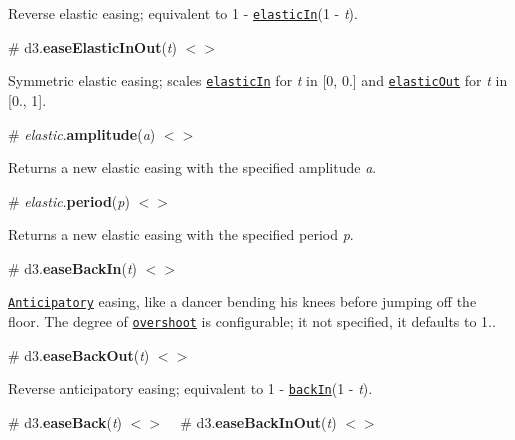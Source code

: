 Reverse elastic easing; equivalent to 1 -\/ \href{#easeElasticIn}{\tt elastic\+In}(1 -\/ {\itshape t}).

\href{http://bl.ocks.org/mbostock/248bac3b8e354a9103c4/#elasticOut}{\tt }

\label{_easeElasticInOut}%
\# d3.{\bfseries ease\+Elastic\+In\+Out}({\itshape t}) \href{https://github.com/d3/d3-ease/blob/master/src/elastic.js#L31}{\tt $<$$>$}

Symmetric elastic easing; scales \href{#easeElasticIn}{\tt elastic\+In} for {\itshape t} in \mbox{[}0, 0.\mbox{]} and \href{#easeElasticOut}{\tt elastic\+Out} for {\itshape t} in \mbox{[}0., 1\mbox{]}.

\href{http://bl.ocks.org/mbostock/248bac3b8e354a9103c4/#elasticInOut}{\tt }

\label{_elastic_amplitude}%
\# {\itshape elastic}.{\bfseries amplitude}({\itshape a}) \href{https://github.com/d3/d3-ease/blob/master/src/elastic.js#L40}{\tt $<$$>$}

Returns a new elastic easing with the specified amplitude {\itshape a}.

\label{_elastic_period}%
\# {\itshape elastic}.{\bfseries period}({\itshape p}) \href{https://github.com/d3/d3-ease/blob/master/src/elastic.js#L41}{\tt $<$$>$}

Returns a new elastic easing with the specified period {\itshape p}.

\label{_easeBackIn}%
\# d3.{\bfseries ease\+Back\+In}({\itshape t}) \href{https://github.com/d3/d3-ease/blob/master/src/back.js#L3}{\tt $<$$>$}

\href{https://en.wikipedia.org/wiki/12_basic_principles_of_animation#Anticipation}{\tt Anticipatory} easing, like a dancer bending his knees before jumping off the floor. The degree of \href{#back_overshoot}{\tt overshoot} is configurable; it not specified, it defaults to 1..

\href{http://bl.ocks.org/mbostock/248bac3b8e354a9103c4/#backIn}{\tt }

\label{_easeBackOut}%
\# d3.{\bfseries ease\+Back\+Out}({\itshape t}) \href{https://github.com/d3/d3-ease/blob/master/src/back.js#L15}{\tt $<$$>$}

Reverse anticipatory easing; equivalent to 1 -\/ \href{#easeBackIn}{\tt back\+In}(1 -\/ {\itshape t}).

\href{http://bl.ocks.org/mbostock/248bac3b8e354a9103c4/#backOut}{\tt }

\label{_easeBack}%
\# d3.{\bfseries ease\+Back}({\itshape t}) \href{https://github.com/d3/d3-ease/blob/master/src/back.js}{\tt $<$$>$} ~\newline
\label{_easeBackInOut}%
\# d3.{\bfseries ease\+Back\+In\+Out}({\itshape t}) \href{https://github.com/d3/d3-ease/blob/master/src/back.js#L27}{\tt $<$$>$}

